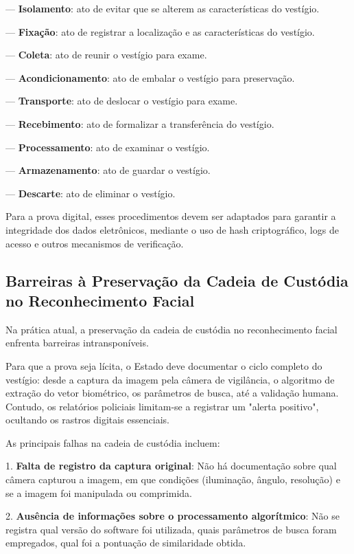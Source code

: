 \documentclass[12pt,a4paper]{article}
\begin{document}
--- \textbf{Isolamento}: ato de evitar que se alterem as características do vestígio.

--- \textbf{Fixação}: ato de registrar a localização e as características do vestígio.

--- \textbf{Coleta}: ato de reunir o vestígio para exame.

--- \textbf{Acondicionamento}: ato de embalar o vestígio para preservação.

--- \textbf{Transporte}: ato de deslocar o vestígio para exame.

--- \textbf{Recebimento}: ato de formalizar a transferência do vestígio.

--- \textbf{Processamento}: ato de examinar o vestígio.

--- \textbf{Armazenamento}: ato de guardar o vestígio.

--- \textbf{Descarte}: ato de eliminar o vestígio.

Para a prova digital, esses procedimentos devem ser adaptados para garantir a integridade dos dados eletrônicos, mediante o uso de hash criptográfico, logs de acesso e outros mecanismos de verificação.

\subsection{Barreiras à Preservação da Cadeia de Custódia no Reconhecimento Facial}

Na prática atual, a preservação da cadeia de custódia no reconhecimento facial enfrenta barreiras intransponíveis.

Para que a prova seja lícita, o Estado deve documentar o ciclo completo do vestígio: desde a captura da imagem pela câmera de vigilância, o algoritmo de extração do vetor biométrico, os parâmetros de busca, até a validação humana. Contudo, os relatórios policiais limitam-se a registrar um "alerta positivo", ocultando os rastros digitais essenciais.

As principais falhas na cadeia de custódia incluem:

1. \textbf{Falta de registro da captura original}: Não há documentação sobre qual câmera capturou a imagem, em que condições (iluminação, ângulo, resolução) e se a imagem foi manipulada ou comprimida.

2. \textbf{Ausência de informações sobre o processamento algorítmico}: Não se registra qual versão do software foi utilizada, quais parâmetros de busca foram empregados, qual foi a pontuação de similaridade obtida.
\end{document}
